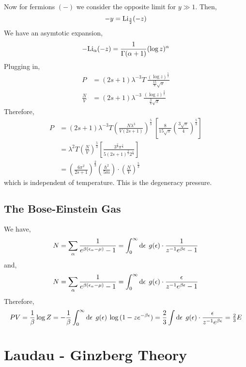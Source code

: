 \documentclass[12pt]{article}
\begin{document}
Now for fermions $(-)$ we consider the opposite limit for $y \gg 1$. Then,
\[ -y = \mathrm{Li}_{\frac{3}{2}}(-z) \]
We have an asymtotic expansion,
\[ -\mathrm{Li}_\alpha(-z) = \frac{1}{\Gamma(\alpha + 1)} (\log{z})^{\alpha} \]
Plugging in,
\begin{align*}
P & = (2 s + 1) \lambda^{-3} T \: \frac{(\log{z})^{\frac{5}{2}}}{\frac{15}{8} \sqrt{\pi}}
\\
\frac{N}{V} & = (2 s + 1) \lambda^{-3} \: \frac{(\log{z})^{\frac{3}{2}}}{\frac{3}{4} \sqrt{\pi}}
\end{align*}
Therefore,
\begin{align*}
P & = (2 s + 1) \lambda^{-3} T \left( \frac{N \lambda^3}{V (2 s + 1)} \right)^{\frac{5}{3}} \: \left[ \frac{8}{15 \sqrt{\pi}} \left( \frac{3 \sqrt{\pi}}{4} \right)^{\frac{5}{3}} \right]
\\
& = \lambda^2 T \left( \frac{N}{V} \right)^{\frac{5}{3}} \left[ \frac{3^{\frac{2}{3}} \pi^{\frac{1}{3}} }{5(2 s + 1)^{\frac{2}{3}} 2^{\frac{1}{3}}}  \right]
\\
& = \left(\frac{6 \pi^2}{2 s + 1} \right)^{\frac{2}{3}} \left( \frac{ \hbar^2}{5 m} \right) \cdot \left( \frac{N}{V} \right)^{\frac{5}{3}} 
\end{align*}
which is independent of temperature. This is the degeneracy pressure. 

\subsection{The Bose-Einstein Gas}

We have,
\[ N = \sum_\alpha \frac{1}{e^{\beta( \epsilon_\alpha - \mu)} - 1} = \int_0^{\infty} \mathrm{d}\epsilon \: \: g(\epsilon) \cdot \frac{1}{z^{-1} e^{\beta \epsilon} - 1} \]
and,
\[  N = \sum_\alpha \frac{1}{e^{\beta( \epsilon_\alpha - \mu)} - 1} = \int_0^{\infty} \mathrm{d}\epsilon \: \: g(\epsilon) \cdot \frac{\epsilon}{z^{-1} e^{\beta \epsilon} - 1} \]
Therefore,
\[ PV = \frac{1}{\beta} \log{Z} = - \frac{1}{\beta} \int_0^{\infty} \mathrm{d}\epsilon \: \: g(\epsilon) \: \log{(1 - z e^{-\beta \epsilon})} = \frac{2}{3} \int \mathrm{d}\epsilon \: \: g(\epsilon) \cdot \frac{\epsilon}{z^{-1} e^{\beta \epsilon}} = \tfrac{2}{3} E  \]

\section{Laudau - Ginzberg Theory}
\end{document}
